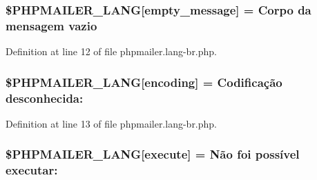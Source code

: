 \subsubsection[{\texorpdfstring{\$\+P\+H\+P\+M\+A\+I\+L\+E\+R\+\_\+\+L\+A\+NG}{$PHPMAILER_LANG}}]{\setlength{\rightskip}{0pt plus 5cm}\$P\+H\+P\+M\+A\+I\+L\+E\+R\+\_\+\+L\+A\+NG\mbox{[}\textquotesingle{}empty\+\_\+message\textquotesingle{}\mbox{]} = \textquotesingle{}Corpo da mensagem vazio\textquotesingle{}}\hypertarget{phpmailer_8lang-br_8php_a33772099f637c9d6c2cd7425e0e37fed}{}\label{phpmailer_8lang-br_8php_a33772099f637c9d6c2cd7425e0e37fed}


Definition at line 12 of file phpmailer.\+lang-\/br.\+php.

\subsubsection[{\texorpdfstring{\$\+P\+H\+P\+M\+A\+I\+L\+E\+R\+\_\+\+L\+A\+NG}{$PHPMAILER_LANG}}]{\setlength{\rightskip}{0pt plus 5cm}\$P\+H\+P\+M\+A\+I\+L\+E\+R\+\_\+\+L\+A\+NG\mbox{[}\textquotesingle{}encoding\textquotesingle{}\mbox{]} = \textquotesingle{}Codificação desconhecida\+: \textquotesingle{}}\hypertarget{phpmailer_8lang-br_8php_a817f7283f3d54c970a0c10305cc668cc}{}\label{phpmailer_8lang-br_8php_a817f7283f3d54c970a0c10305cc668cc}


Definition at line 13 of file phpmailer.\+lang-\/br.\+php.

\subsubsection[{\texorpdfstring{\$\+P\+H\+P\+M\+A\+I\+L\+E\+R\+\_\+\+L\+A\+NG}{$PHPMAILER_LANG}}]{\setlength{\rightskip}{0pt plus 5cm}\$P\+H\+P\+M\+A\+I\+L\+E\+R\+\_\+\+L\+A\+NG\mbox{[}\textquotesingle{}execute\textquotesingle{}\mbox{]} = \textquotesingle{}Não foi possível executar\+: \textquotesingle{}}\hypertarget{phpmailer_8lang-br_8php_a668217a9563a168f30f2a8548b6ed5a9}{}\label{phpmailer_8lang-br_8php_a668217a9563a168f30f2a8548b6ed5a9}


